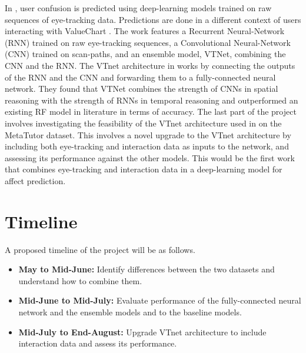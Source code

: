 \documentclass[10pt,letterpaper]{article}
\begin{document}
In \cite{sims2020neural}, user confusion is predicted using deep-learning models trained on raw sequences of eye-tracking data. Predictions are done in a different context of users interacting with ValueChart \autocite{carenini2004valuecharts}. The work features a Recurrent Neural-Network (RNN) trained on raw eye-tracking sequences, a Convolutional Neural-Network (CNN) trained on scan-paths, and an ensemble model, VTNet, combining the CNN and the RNN. The VTnet architecture in \cite{sims2020neural} works by connecting the outputs of the RNN and the CNN and forwarding them to a fully-connected neural network. They found that VTNet combines the strength of CNNs in spatial reasoning with the strength of RNNs in temporal reasoning and outperformed an existing RF model in literature \autocite{lalle2016predicting} in terms of accuracy.
The last part of the project involves investigating the feasibility of the VTnet architecture used in \cite{sims2020neural} on the MetaTutor dataset. This involves a novel upgrade to the VTnet architecture by including both eye-tracking and interaction data as inputs to the network, and assessing its performance against the other models. This would be the first work that combines eye-tracking and interaction data in a deep-learning model for affect prediction.

\section{Timeline}

A proposed timeline of the project will be as follows.

\begin{itemize}
    \item \textbf{May to Mid-June:} Identify differences between the two datasets and understand how to combine them.

    \item \textbf{Mid-June to Mid-July:} Evaluate performance of the fully-connected neural network and the ensemble models and to the baseline models.

    \item \textbf{Mid-July to End-August:} Upgrade VTnet architecture to include interaction data and assess its performance.

\end{itemize}

\printbibliography
\end{document}
